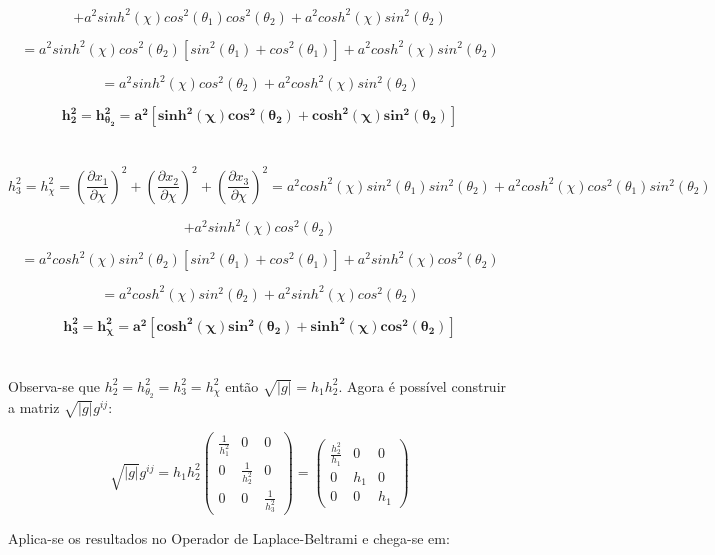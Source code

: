 \documentclass[12pt, a4papper]{article}
\begin{document}
\[+a^{2}sinh^{2}(\chi)cos^{2}(\theta_{1})cos^{2}(\theta_{2})+a^{2}cosh^{2}(\chi)sin^{2}(\theta_{2}) \]

\[
=a^{2}sinh^{2}(\chi)cos^{2}(\theta_{2})\left[sin^{2}(\theta_{1})+cos^{2}(\theta_{1})\right]+a^{2}cosh^{2}(\chi)sin^{2}(\theta_{2})
\]

\[
=a^{2}sinh^{2}(\chi)cos^{2}(\theta_{2})+a^{2}cosh^{2}(\chi)sin^{2}(\theta_{2})
\]

\[
\boldsymbol{h_{2}^{2}=h_{\theta_{2}}^{2}=a^{2}\left[sinh^{2}(\chi)cos^{2}(\theta_{2})+cosh^{2}(\chi)sin^{2}(\theta_{2})\right]}
\]
\\
\\
\[
h_{3}^{2}=h_{\chi}^{2}=\left(\frac{\partial x_{1}}{\partial\chi}\right)^{2}+\left(\frac{\partial x_{2}}{\partial\chi}\right)^{2}+\left(\frac{\partial x_{3}}{\partial\chi}\right)^{2}=a^{2}cosh^{2}(\chi)sin^{2}(\theta_{1})sin^{2}(\theta_{2})+a^{2}cosh^{2}(\chi)cos^{2}(\theta_{1})sin^{2}(\theta_{2})
\]

\[ +a^{2}sinh^{2}(\chi)cos^{2}(\theta_{2})\]

\[
=a^{2}cosh^{2}(\chi)sin^{2}(\theta_{2})\left[sin^{2}(\theta_{1})+cos^{2}(\theta_{1})\right]+a^{2}sinh^{2}(\chi)cos^{2}(\theta_{2})
\]

\[
=a^{2}cosh^{2}(\chi)sin^{2}(\theta_{2})+a^{2}sinh^{2}(\chi)cos^{2}(\theta_{2})
\]

\[
\boldsymbol{h_{3}^{2}=h_{\chi}^{2}=a^{2}\left[cosh^{2}(\chi)sin^{2}(\theta_{2})+sinh^{2}(\chi)cos^{2}(\theta_{2})\right]}
\]
\\
\\
Observa-se que $h_{2}^{2}=h_{\theta_{2}}^{2}=h_{3}^{2}=h_{\chi}^{2}$
então $\sqrt{|g|}=h_{1}h_{2}^{2}$. Agora é possível construir a matriz
$\sqrt{|g|}g^{ij}$:

\[
\sqrt{|g|}g^{ij}=h_{1}h_{2}^{2}\left(\begin{array}{ccc}
\frac{1}{h_{1}^{2}} & 0 & 0\\
0 & \frac{1}{h_{2}^{2}} & 0\\
0 & 0 & \frac{1}{h_{3}^{2}}
\end{array}\right)=\left(\begin{array}{ccc}
\frac{h_{2}^{2}}{h_{1}} & 0 & 0\\
0 & h_{1} & 0\\
0 & 0 & h_{1}
\end{array}\right)
\]

Aplica-se os resultados no Operador de Laplace-Beltrami e chega-se
em:
\end{document}
